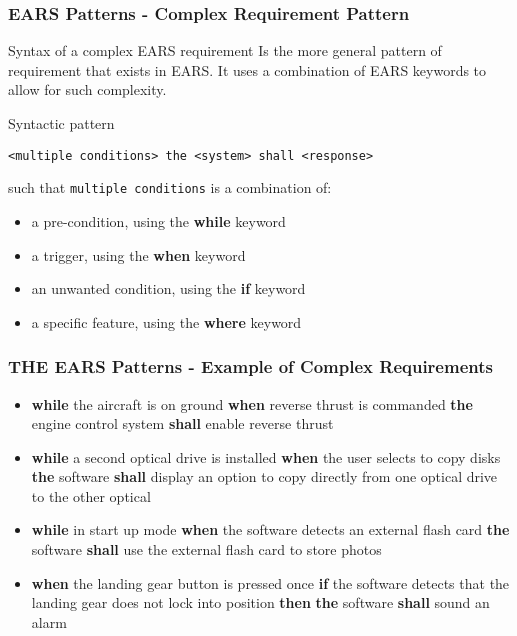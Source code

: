 \documentclass[aspectratio=169]{beamer}
\newcommand{\earsg}[4]{{\bf \color{mygreen}while} {#1} {\bf \color{mygreen}when} {#2} %
                      {\bf \color{mypurple}the} {#3} {\bf \color{mypurple}shall} {#4}}
\newcommand{\earsw}[3]{{\bf \color{mygreen}if} {#1} {\bf \color{mygreen}then} {\bf \color{mypurple}the} {#2} {\bf \color{mypurple}shall} {#3}}
\begin{document}
%
%
\begin{frame}[fragile]
  \frametitle{EARS Patterns - Complex Requirement Pattern}
  \begin{block}{Syntax of a complex EARS requirement}
    Is the more general pattern of requirement that exists in EARS. It uses a combination of EARS keywords to allow for such complexity.
  \end{block}
  \begin{block}{Syntactic pattern}
    \begin{lstlisting}[language=EARS]
    <multiple conditions> the <system> shall <response>  
    \end{lstlisting}
    such that {\tt multiple conditions} is a combination of:
    \begin{itemize}
      \item a pre-condition, using the {\bf \color{mygreen} while} keyword
      \item a trigger, using the {\bf \color{mygreen} when} keyword
      \item an unwanted condition, using the {\bf \color{mygreen} if} keyword
      \item a specific feature, using the {\bf \color{mygreen} where} keyword
    \end{itemize}
  \end{block}
\end{frame}
%
\begin{frame}[fragile]
 \frametitle{THE EARS Patterns - Example of Complex Requirements}
  \begin{example}
  \begin{itemize}
  \item \earsg{the aircraft is on ground}{reverse thrust is commanded}{engine control system}{enable reverse thrust}
  \item \earsg{a second optical drive is installed}{the user selects to copy disks}{software}{display an option to copy directly from one optical drive to the other optical}
  \item \earsg{in start up mode}{the software detects an external flash card}{software}{use the external
flash card to store photos}
  \item {\bf \color{mygreen}when} the landing gear button is pressed once \earsw{the software detects that the landing gear does not lock into position}{software}{sound an alarm}
  \end{itemize}
  \end{example}
\end{frame}
\end{document}
